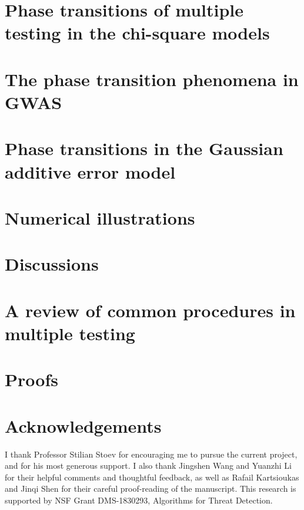 \documentclass[aos, preprint]{imsart}
\numberwithin{equation}{section}
\theoremstyle{plain}
\theoremstyle{definition}
\theoremstyle{remark}
\begin{document}
\section{Phase transitions of multiple testing in the chi-square models}
\label{sec:chisq-boundaries}


\section{The phase transition phenomena in GWAS}
\label{sec:signal-size-odds-ratio}


\section{Phase transitions in the Gaussian additive error model}
\label{sec:additive-error-model-boundaries}


\section{Numerical illustrations}
\label{sec:numerical}


\section{Discussions}
\label{sec:discussions}


\appendix

\section{A review of common procedures in multiple testing}
\label{sec:procedures}


\section{Proofs}
\label{sec:proofs}



\section*{Acknowledgements}
I thank Professor Stilian Stoev for encouraging me to pursue the current project, and for his most generous support.
I also thank Jingshen Wang and Yuanzhi Li for their helpful comments and thoughtful feedback, as well as Rafail Kartsioukas and Jinqi Shen for their careful proof-reading of the manuscript.
This research is supported by NSF Grant DMS-1830293, Algorithms for Threat Detection.
% 


\end{document}
